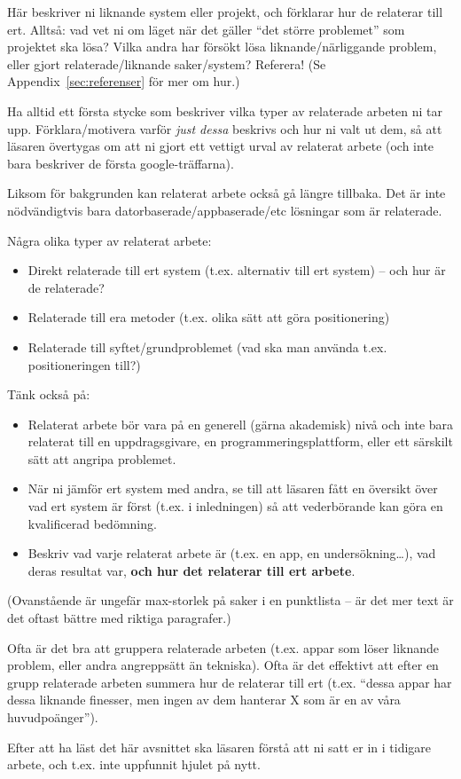 Här beskriver ni liknande system eller projekt, och förklarar hur de relaterar till ert.  Alltså: vad vet ni om läget när det gäller ``det större problemet'' som projektet ska lösa?  Vilka andra har försökt lösa liknande/närliggande problem, eller gjort relaterade/liknande saker/system? Referera! (Se Appendix~\ref{sec:referenser} för mer om hur.)

Ha alltid ett första stycke som beskriver vilka typer av relaterade arbeten ni tar upp.  Förklara/motivera varför \emph{just dessa} beskrivs och hur ni valt ut dem, så att läsaren övertygas om att ni gjort ett vettigt urval av relaterat arbete (och inte bara beskriver de första google-träffarna). %

Liksom för bakgrunden kan relaterat arbete också gå längre tillbaka. Det är inte nöd\-vän\-digt\-vis bara datorbaserade/appbaserade/etc lösningar som är relaterade.

Några olika typer av relaterat arbete:
\begin{itemize}
\item Direkt relaterade till ert system (t.ex. alternativ till ert system) – och hur är de relaterade?
\item Relaterade till era metoder (t.ex. olika sätt att göra positionering)
\item Relaterade till syftet/grundproblemet (vad ska man använda t.ex. positioneringen till?)
\end{itemize}

Tänk också på:

\begin{itemize}
\item 
  Relaterat arbete bör vara på en generell (gärna akademisk) nivå och inte bara relaterat till en uppdragsgivare, en programmeringsplattform, eller ett särskilt sätt att angripa problemet.
\item 
  När ni jämför ert system med andra, se till att läsaren fått en översikt över vad ert system är först (t.ex. i inledningen) så att vederbörande kan göra en kvalificerad bedömning.
\item
 Beskriv vad varje relaterat arbete är (t.ex. en app, en undersökning\ldots), vad deras resultat var, \textbf{och hur det relaterar till ert arbete}.
\end{itemize}

(Ovanstående är ungefär max-storlek på saker i en punktlista -- är det mer text är det oftast bättre med riktiga paragrafer.)

Ofta är det bra att gruppera relaterade arbeten (t.ex. appar som löser liknande problem, eller andra angreppsätt än tekniska).
Ofta är det effektivt att efter en grupp relaterade arbeten summera hur de relaterar till ert (t.ex. ``dessa appar har dessa liknande finesser, men ingen av dem hanterar X som är en av våra huvudpoänger'').


Efter att ha läst det här avsnittet ska läsaren förstå att ni satt er in i tidigare arbete, och t.ex. inte uppfunnit hjulet på nytt.

